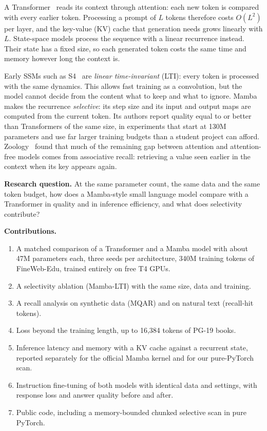 \documentclass[conference]{IEEEtran}
\begin{document}
A Transformer~\cite{vaswani2017attention} reads its context through attention: each new token is
compared with every earlier token. Processing a prompt of $L$ tokens therefore costs $O(L^2)$ per
layer, and the key-value (KV) cache that generation needs grows linearly with $L$. State-space models
process the sequence with a linear recurrence instead. Their state has a fixed size, so each generated
token costs the same time and memory however long the context is.

Early SSMs such as S4~\cite{gu2022s4} are \emph{linear time-invariant} (LTI): every token is processed
with the same dynamics. This allows fast training as a convolution, but the model cannot decide from
the content what to keep and what to ignore. Mamba~\cite{gu2023mamba} makes the recurrence
\emph{selective}: its step size and its input and output maps are computed from the current token. Its
authors report quality equal to or better than Transformers of the same size, in experiments that
start at 130M parameters and use far larger training budgets than a student project can afford.
Zoology~\cite{arora2023zoology} found that much of the remaining gap between attention and
attention-free models comes from associative recall: retrieving a value seen earlier in the context
when its key appears again.

\textbf{Research question.} At the same parameter count, the same data and the same token budget, how
does a Mamba-style small language model compare with a Transformer in quality and in inference
efficiency, and what does selectivity contribute?

\textbf{Contributions.}
\begin{enumerate}
  \item A matched comparison of a Transformer and a Mamba model with about 47M parameters each, three
        seeds per architecture, 340M training tokens of FineWeb-Edu, trained entirely on free T4 GPUs.
  \item A selectivity ablation (Mamba-LTI) with the same size, data and training.
  \item A recall analysis on synthetic data (MQAR) and on natural text (recall-hit tokens).
  \item Loss beyond the training length, up to 16,384 tokens of PG-19 books.
  \item Inference latency and memory with a KV cache against a recurrent state, reported separately for
        the official Mamba kernel and for our pure-PyTorch scan.
  \item Instruction fine-tuning of both models with identical data and settings, with response loss and
        answer quality before and after.
  \item Public code, including a memory-bounded chunked selective scan in pure PyTorch.
\end{enumerate}
\end{document}

